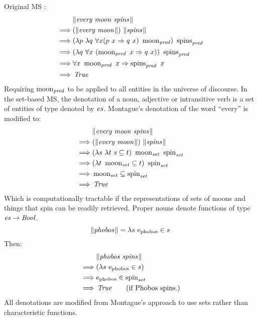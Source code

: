 \documentclass[../main.tex]{subfiles}
\begin{document}
\begin{refsection}
Original MS \cite{Dowty:wall}:
\begin{equation*}
	\begin{split}
		& \lVert\textit{every moon spins\hspace{0.1em}}\rVert \\
		\implies&  (\lVert\textit{every moon\hspace{0.1em}}\rVert) \ \lVert\textit{spins\hspace{0.1em}}\rVert \\
		\implies&  (\lambda p \ \lambda q \ \forall x (p \  x \Rightarrow q \  x) \  \operatorname{moon}_{\operatorname{\mathit{pred}}}) \  \operatorname{spins}_{\operatorname{\mathit{pred}}} \\
		\implies&  (\lambda q \ \forall x \ (\operatorname{moon}_{\operatorname{\mathit{pred}}} \ x \Rightarrow q \ x)) \  \operatorname{spins}_{\operatorname{\mathit{pred}}} \\
		\implies&  \forall x \ \operatorname{moon}_{\operatorname{\mathit{pred}}} \ x \Rightarrow \operatorname{spins}_{\operatorname{\mathit{pred}}} \ x \\
		\implies&  \operatorname{\mathit{True}}
	\end{split}
\end{equation*}
Requiring $\operatorname{moon}_{\operatorname{\mathit{pred}}}$ to be applied to all entities in the universe of discourse. In the set-based MS, the denotation of a noun, adjective or intransitive verb is a set of entities of type denoted by $\operatorname{\mathit{es}}$.
Montague's denotation of the word ``every'' is modified to:
\begin{equation*}
	\begin{split}
		& \meaningof{every moon spins} \\
		\implies&  (\meaningof{every moon}) \  \meaningof{spins} \\
		\implies&  (\lambda s \ \lambda t \ s \subseteq t)\ \wordset{moon} \ \wordset{spin} \\
		\implies&  (\lambda t \ \wordset{moon} \subseteq t)\ \wordset{spin} \\
		\implies&  \wordset{moon} \subseteq \wordset{spin} \\
		\implies&  \True
	\end{split}
\end{equation*}
Which is computationally tractable if the representations of sets of moons and things that spin can be readily retrieved.
Proper nouns denote functions of type $\operatorname{\mathit{es}} \rightarrow \operatorname{\mathit{Bool}}$.
\[
\meaningof{phobos} = \lambda s\ \entityassoc{phobos} \in s
\]
Then:
\begin{equation*}
	\begin{split}
		& \lVert\textit{phobos spins\hspace{0.1em}}\rVert \\
		\implies& (\lambda s\ \mathrm{e}_{\operatorname{phobos}} \in s) \\
		\implies& \mathrm{e}_{\operatorname{phobos}} \in \operatorname{spin}_{\operatorname{\mathit{set}}} \\
		\implies& \operatorname{\mathit{True}} \qquad(\text{if Phobos spins.})
	\end{split}
\end{equation*}
All denotations are modified from Montague's approach to use sets rather than characteristic functions.


\end{refsection}
\end{document}
